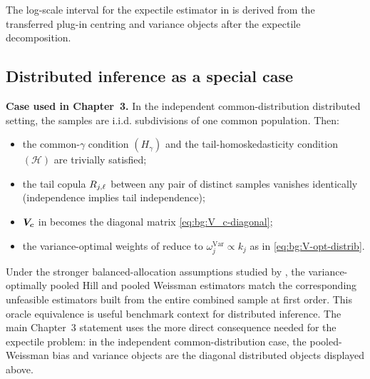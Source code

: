 The log-scale interval for the expectile estimator in
 is derived from the transferred plug-in
centring and variance objects after the expectile decomposition.

\subsection{Distributed inference as a special case}
\label{sec:bg:pool-distrib}

\noindent\textbf{Case used in Chapter~3.}
In the independent common-distribution distributed setting, the samples
are i.i.d. subdivisions of one common population. Then:
\begin{itemize}
\item the common-$\gamma$ condition $(H_{\gamma})$ and the
      tail-homoskedasticity condition $(\mathcal H)$ are trivially
      satisfied;
\item the tail copula $R_{j,\ell}$ between any pair of distinct samples
      vanishes identically (independence implies tail independence);
\item $\bm{V}_{\bm{c}}$ in  becomes the diagonal matrix
      \eqref{eq:bg:V_c-diagonal};
\item the variance-optimal weights of 
      reduce to $\omega_{j}^{\mathrm{Var}} \propto k_{j}$ as in
      \eqref{eq:bg:V-opt-distrib}.
\end{itemize}

Under the stronger balanced-allocation assumptions studied by
\textcite[Corollary~6, Theorem~3 and Corollary~8]{DaouiaPadoanStupfler2021},
the variance-optimally pooled Hill and pooled Weissman estimators match
the corresponding unfeasible estimators built from the entire combined
sample at first order. This oracle equivalence is useful benchmark
context for distributed inference. The main Chapter~3 statement uses the more
direct consequence needed for the
expectile problem: in the independent common-distribution case, the
pooled-Weissman bias and variance objects are the diagonal distributed
objects displayed above.

